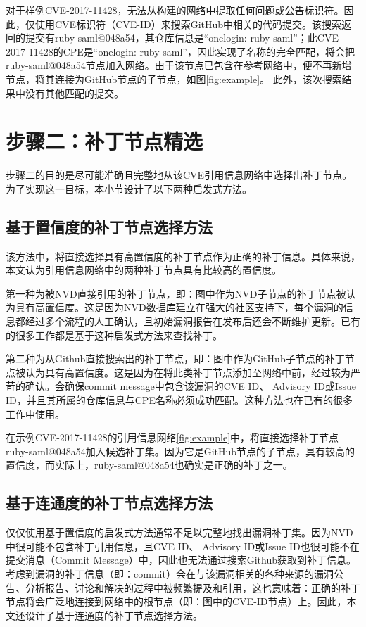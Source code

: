\begin{exmp}
对于样例CVE-2017-11428，\tool 无法从构建的网络中提取任何问题或公告标识符。因此，\tool 仅使用CVE标识符（CVE-ID）来搜索GitHub中相关的代码提交。该搜索返回的提交有ruby-saml@048a54，其仓库信息是“onelogin: ruby-saml”；此CVE-2017-11428的CPE是“onelogin: ruby-saml”，因此实现了名称的完全匹配，\tool 将会把ruby-saml@048a54节点加入网络。由于该节点已包含在参考网络中，\tool 便不再新增节点，将其连接为GitHub节点的子节点，如图\ref{fig:example}。 此外，该次搜索结果中没有其他匹配的提交。
\end{exmp}   

\section{步骤二：补丁节点精选}\label{sec:selection}

步骤二的目的是尽可能准确且完整地从该CVE引用信息网络中选择出补丁节点。 为了实现这一目标，本小节设计了以下两种启发式方法。

\subsection{基于置信度的补丁节点选择方法}
该方法中，\tool 将直接选择具有高置信度的补丁节点作为正确的补丁信息。具体来说，本文认为引用信息网络中的两种补丁节点具有比较高的置信度。

第一种为被NVD直接引用的补丁节点，即：图中作为NVD子节点的补丁节点被认为具有高置信度。这是因为NVD数据库建立在强大的社区支持下，每个漏洞的信息都经过多个流程的人工确认，且初始漏洞报告在发布后还会不断维护更新。已有的很多工作\cite{duan2019automating, li2016vulpecker, li2018vuldeepecker}都是基于这种启发式方法来查找补丁。

第二种为从Github直接搜索出的补丁节点，即：图中作为GitHub子节点的补丁节点被认为具有高置信度。这是因为在将此类补丁节点添加至网络中前，经过较为严苛的确认。\tool 会确保commit message中包含该漏洞的CVE ID、 Advisory ID或Issue ID，并且其所属的仓库信息与CPE名称必须成功匹配。这种方法也在已有的很多工作\cite{you2017semfuzz, Wang2020empirical}中使用。

\begin{exmp}
在示例CVE-2017-11428的引用信息网络\ref{fig:example}中，\tool 将直接选择补丁节点ruby-saml@048a54加入候选补丁集。因为它是GitHub节点的子节点，具有较高的置信度，而实际上，ruby-saml@048a54也确实是正确的补丁之一。
\end{exmp}

\subsection{基于连通度的补丁节点选择方法}
仅仅使用基于置信度的启发式方法通常不足以完整地找出漏洞补丁集。因为NVD中很可能不包含补丁引用信息，且CVE ID、 Advisory ID或Issue ID也很可能不在提交消息（Commit Message）中，因此也无法通过搜索Github获取到补丁信息。考虑到漏洞的补丁信息（即：commit）会在与该漏洞相关的各种来源的漏洞公告、分析报告、讨论和解决的过程中被频繁提及和引用，这也意味着：正确的补丁节点将会广泛地连接到网络中的根节点（即：图中的CVE-ID节点）上。因此，本文还设计了基于连通度的补丁节点选择方法。


